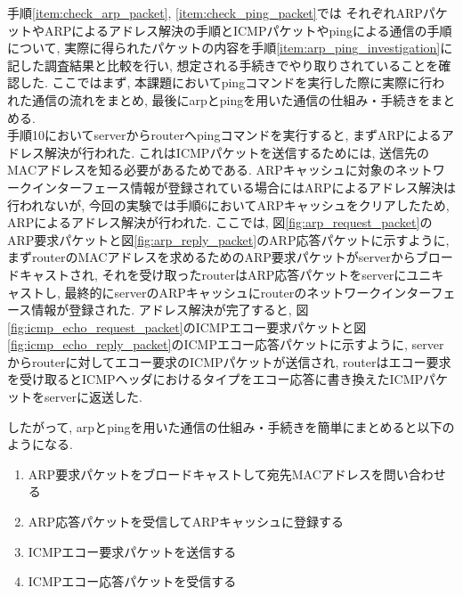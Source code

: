 \begin{enumerate}[label=\arabic*.]
        \vspace{\baselineskip}
        \quad
        手順\ref{item:check_arp_packet}, \ref{item:check_ping_packet}では
        それぞれARPパケットやARPによるアドレス解決の手順とICMPパケットやpingによる通信の手順について,
        実際に得られたパケットの内容を手順\ref{item:arp_ping_investigation}に記した調査結果と比較を行い, 
        想定される手続きでやり取りされていることを確認した.
        ここではまず, 本課題においてpingコマンドを実行した際に実際に行われた通信の流れをまとめ, 最後にarpとpingを用いた通信の仕組み・手続きをまとめる.
        \\
        \quad
        手順10においてserverからrouterへpingコマンドを実行すると, 
        まずARPによるアドレス解決が行われた.
        これはICMPパケットを送信するためには, 送信先のMACアドレスを知る必要があるためである.
        ARPキャッシュに対象のネットワークインターフェース情報が登録されている場合にはARPによるアドレス解決は行われないが, 
        今回の実験では手順6においてARPキャッシュをクリアしたため,
        ARPによるアドレス解決が行われた.
        ここでは, 図\ref{fig:arp_request_packet}のARP要求パケットと図\ref{fig:arp_reply_packet}のARP応答パケットに示すように,
        まずrouterのMACアドレスを求めるためのARP要求パケットがserverからブロードキャストされ, 
        それを受け取ったrouterはARP応答パケットをserverにユニキャストし, 
        最終的にserverのARPキャッシュにrouterのネットワークインターフェース情報が登録された.
        アドレス解決が完了すると, 
        図\ref{fig:icmp_echo_request_packet}のICMPエコー要求パケットと図\ref{fig:icmp_echo_reply_packet}のICMPエコー応答パケットに示すように,
        serverからrouterに対してエコー要求のICMPパケットが送信され,
        routerはエコー要求を受け取るとICMPヘッダにおけるタイプをエコー応答に書き換えたICMPパケットをserverに返送した.

        \quad
        したがって, arpとpingを用いた通信の仕組み・手続きを簡単にまとめると以下のようになる.


        \vspace{\baselineskip}
        \begin{enumerate}[label=\textcircled{\scriptsize\arabic*}]
            \item ARP要求パケットをブロードキャストして宛先MACアドレスを問い合わせる
            \item ARP応答パケットを受信してARPキャッシュに登録する
            \item ICMPエコー要求パケットを送信する
            \item ICMPエコー応答パケットを受信する
        \end{enumerate}
\end{enumerate}
\newpage


% 

